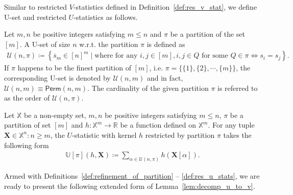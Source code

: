 \documentclass[twoside,11pt]{article}
\newcommand{\sPi}{\pi}
\newcommand{\uset}{\calU}
\newcommand{\usetnm}[2]{\uset\left(#1,#2\right)}
\newcommand{\ustat}{\mathbb{U}}
\newcommand{\perm}[1]{\mathsf{Perm}(#1)}
\def\bbX{\mathbb{X}}
\def\bbR{\mathbb{R}}
\def\calU{\mathcal{U}}
\begin{document}
Similar to restricted $V$-statistics defined in Definition~\ref{def:res_v_stat}, we define U-set and restricted $U$-statistics as follows. 

\begin{definition}[U-Set]\label{def:u_set}
Let $m,n$ be positive integers satisfying $m \leq n$ and $\sPi$ be a partition of the set $[m]$. A U-set of size $n$ w.r.t. the partition $\sPi$ is defined as
    \begin{align*}
        \usetnm{n}{\sPi} \coloneqq \left\{ \overline{s}_m \in [n]^m \mid \text{where for any $i, j \in [m]$}, i, j \in Q \text{ for some $Q \in \sPi$} \iff   s_i = s_j \right\}.
    \end{align*}
    If $\sPi$ happens to be the finest partition of $[m]$, i.e. $\sPi = \{\{1\}, \{2\}, \cdots, \{m\}\}$, the corresponding U-set is denoted by $\uset(n,m)$ and in fact, $\uset(n,m) \equiv \perm{n,m}$. The cardinality of the given partition $\sPi$ is referred to as the order of $\usetnm{n}{\sPi}$.
\end{definition}

\begin{definition}\label{def:res_u_stats}
    Let $\bbX$ be a non-empty set, $m, n$ be positive integers satisfying $m \leq n$, $\sPi$ be a partition of set $[m]$ and $h: \bbX^{m} \rightarrow \bbR$ be a function defined on $\bbX^m$. For any tuple $\bm{X} \in \bbX^n: n \geq m$, the $U$-statistic with kernel $h$ restricted by partition $\sPi$ takes the following form 
    \begin{align*}
        \ustat[\pi](h, \bm{X}) \coloneqq \sum_{\alpha \in \uset(n,\pi)} h(\bm{X}[\alpha]). 
    \end{align*}
\end{definition}

Armed with Definitions~\ref{def:refinement_of_partition} -- \ref{def:res_u_stats}, we are ready to present the following extended form of Lemma~\ref{lem:decomp_u_to_v}. 
\end{document}
